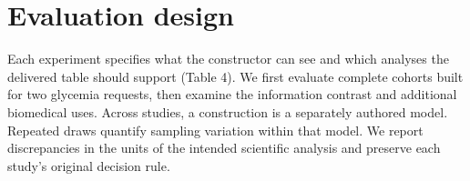 \documentclass[11pt,letterpaper]{article}
\begin{document}
\section{Evaluation design}

Each experiment specifies what the constructor can see and which analyses the delivered table should support (Table 4). We first evaluate complete cohorts built for two glycemia requests, then examine the information contrast and additional biomedical uses. Across studies, a construction is a separately authored model. Repeated draws quantify sampling variation within that model. We report discrepancies in the units of the intended scientific analysis and preserve each study's original decision rule.


\FloatBarrier

\begingroup

\small

\renewcommand{\arraystretch}{1.22}
\end{document}
